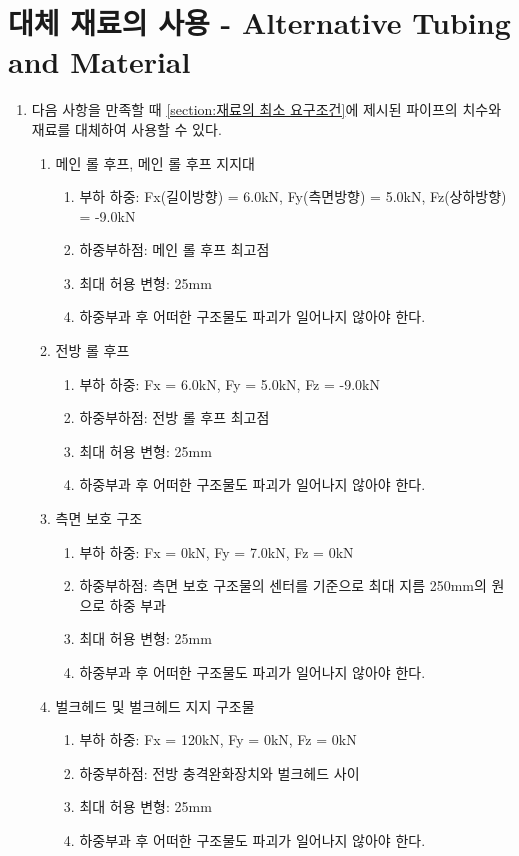 \documentclass[final,a4paper,10pt]{report}
\begin{document}
\section{대체 재료의 사용 - Alternative Tubing and Material}
\begin{enumerate}
  \item 다음 사항을 만족할 때 \cref{section:재료의 최소 요구조건}에 제시된 파이프의 치수와 재료를 대체하여 사용할 수 있다. \label{item:대체 재료 조건}
    \begin{enumerate}
      \item 메인 롤 후프, 메인 롤 후프 지지대
        \begin{enumerate}
          \item 부하 하중: Fx(길이방향) = 6.0kN, Fy(측면방향) = 5.0kN, Fz(상하방향) = -9.0kN
          \item 하중부하점: 메인 롤 후프 최고점
          \item 최대 허용 변형: 25mm
          \item 하중부과 후 어떠한 구조물도 파괴가 일어나지 않아야 한다.
        \end{enumerate}
      \item 전방 롤 후프
        \begin{enumerate}
          \item 부하 하중: Fx = 6.0kN, Fy = 5.0kN, Fz = -9.0kN
          \item 하중부하점: 전방 롤 후프 최고점
          \item 최대 허용 변형: 25mm
          \item 하중부과 후 어떠한 구조물도 파괴가 일어나지 않아야 한다.
        \end{enumerate}
      \item 측면 보호 구조
        \begin{enumerate}
          \item 부하 하중: Fx = 0kN, Fy = 7.0kN, Fz = 0kN
          \item 하중부하점: 측면 보호 구조물의 센터를 기준으로 최대 지름 250mm의 원으로 하중 부과
          \item 최대 허용 변형: 25mm
          \item 하중부과 후 어떠한 구조물도 파괴가 일어나지 않아야 한다.
        \end{enumerate}
      \item 벌크헤드 및 벌크헤드 지지 구조물
        \begin{enumerate}
          \item 부하 하중: Fx = 120kN, Fy = 0kN, Fz = 0kN
          \item 하중부하점: 전방 충격완화장치와 벌크헤드 사이
          \item 최대 허용 변형: 25mm
          \item 하중부과 후 어떠한 구조물도 파괴가 일어나지 않아야 한다.
        \end{enumerate}
    \end{enumerate}


\end{enumerate}
\end{document}

